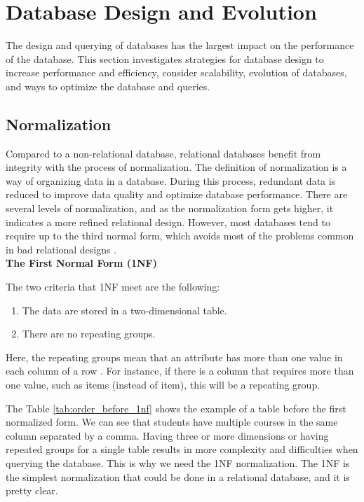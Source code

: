 \section{Database Design and Evolution} \label{sec:db design and evolution}
The design and querying of databases has the largest impact on the performance of the database.
This section investigates strategies for database design to increase performance and efficiency,
consider scalability, evolution of databases, and ways to optimize the database and queries.

\subsection[Normalization]{Normalization}
Compared to a non-relational database, relational databases benefit from integrity with the process of normalization.
The definition of normalization is a way of organizing data in a database.
During this process, redundant data is reduced to improve data quality and optimize database performance.
There are several levels of normalization, and as the normalization form gets higher,
it indicates a more refined relational design. However, most databases tend to require up to the third normal form,
which avoids most of the problems common in bad relational designs \cite{Harrington_2016}.\\

\textbf{The First Normal Form (1NF)}

The two criteria that 1NF meet are the following:

\begin{enumerate}
    \item The data are stored in a two-dimensional table.
    \item There are no repeating groups. 
\end{enumerate}

Here, the repeating groups mean that an attribute has more than one value in each column of a row \cite{Harrington_2016}. 
For instance, if there is a column that requires more than one value, such as items (instead of item), this will be a repeating group.



The Table \ref{tab:order_before_1nf} shows the example of a table before the first normalized form. We can see that students have multiple courses in the same column separated by a comma.
Having three or more dimensions or having repeated groups for a single table results in more complexity and difficulties when querying the database. 
This is why we need the 1NF normalization. The 1NF is the simplest normalization that could be done in a relational database, and it is pretty clear. 

